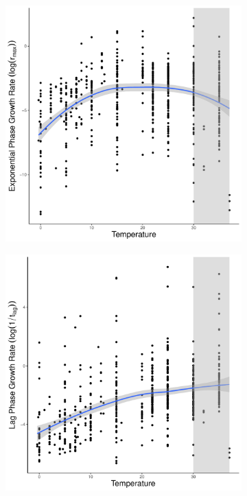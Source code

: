 \documentclass[a4paper]{article}
\begin{document}
\begin{figure}[ht!]
\centering
    \begin{subfigure}{.47\textwidth}
      \centering
      \includegraphics[width=.9\linewidth]{Plot/log_r_temp.pdf}
      \caption{}
      \label{fig:log_r_temp}
    \end{subfigure}%
    \begin{subfigure}{.47\textwidth}
      \centering
      \includegraphics[width=.9\linewidth]{Plot/log_1tlag_temp.pdf}

\end{subfigure}
\end{figure}
\end{document}
